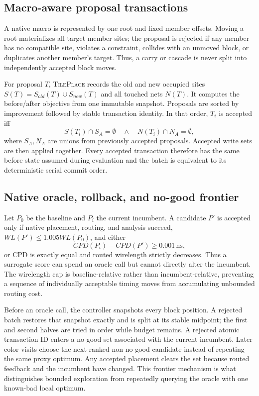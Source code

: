 \documentclass[sigconf,anonymous,review]{acmart}
\newcommand{\system}{\textsc{TilePlace}}
\begin{document}
\subsection{Macro-aware proposal transactions}

A native macro is represented by one root and fixed member offsets.  Moving a
root materializes all target member sites; the proposal is rejected if any
member has no compatible site, violates a constraint, collides with an
unmoved block, or duplicates another member's target.  Thus, a carry or
cascade is never split into independently accepted block moves.

For proposal $T$, \system{} records the old and new occupied sites
$S(T)=S_{old}(T)\cup S_{new}(T)$ and all touched nets $N(T)$.  It computes the
before/after objective from one immutable snapshot.  Proposals are sorted by
improvement followed by stable transaction identity.  In that order, $T_i$ is
accepted iff
\begin{equation}
 S(T_i)\cap S_A=\emptyset \quad\land\quad
 N(T_i)\cap N_A=\emptyset,
\end{equation}
where $S_A,N_A$ are unions from previously accepted proposals.  Accepted
write sets are then applied together.  Every accepted transaction therefore
has the same before state assumed during evaluation and the batch is
equivalent to its deterministic serial commit order.

\subsection{Native oracle, rollback, and no-good frontier}

Let $P_0$ be the baseline and $P_i$ the current incumbent.  A candidate
$P'$ is accepted only if native placement, routing, and analysis succeed,
$WL(P')\le 1.005WL(P_0)$, and either
\begin{equation}
 CPD(P_i)-CPD(P')\ge 0.001\,\mathrm{ns},
 \label{eq:oracle}
\end{equation}
or CPD is exactly equal and routed wirelength strictly decreases.  Thus a
surrogate score can spend an oracle call but cannot directly alter the
incumbent.  The wirelength cap is baseline-relative rather than
incumbent-relative, preventing a sequence of individually acceptable timing
moves from accumulating unbounded routing cost.

Before an oracle call, the controller snapshots every block position.  A
rejected batch restores that snapshot exactly and is split at its stable
midpoint; the first and second halves are tried in order while budget remains.
A rejected atomic transaction ID enters a no-good set associated with the
current incumbent.  Later color visits choose the next-ranked non-no-good
candidate instead of repeating the same proxy optimum.  Any accepted
placement clears the set because routed feedback and the incumbent have
changed.  This frontier mechanism is what distinguishes bounded exploration
from repeatedly querying the oracle with one known-bad local optimum.
\end{document}

